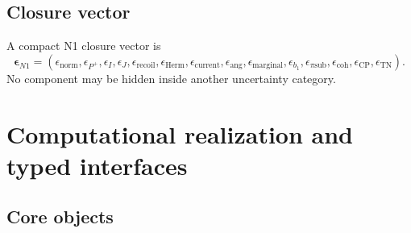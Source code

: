 \documentclass[11pt]{article}
\begin{document}
\subsection{Closure vector}

A compact N1 closure vector is
\begin{equation}
 \bm\epsilon_{N1}
 =
 \left(
 \epsilon_{\mathrm{norm}},
 \epsilon_{P^+},
 \epsilon_I,
 \epsilon_J,
 \epsilon_{\mathrm{recoil}},
 \epsilon_{\mathrm{Herm}},
 \epsilon_{\mathrm{current}},
 \epsilon_{\mathrm{ang}},
 \epsilon_{\mathrm{marginal}},
 \epsilon_{b_1},
 \epsilon_{\pi\mathrm{sub}},
 \epsilon_{\mathrm{coh}},
 \epsilon_{\mathrm{CP}},
 \epsilon_{\mathrm{TN}}
 \right).
 \label{eq:n1-closure-vector}
\end{equation}
No component may be hidden inside another uncertainty category.

\section{Computational realization and typed interfaces}
\label{sec:software}

\subsection{Core objects}
\end{document}
